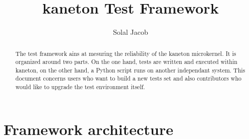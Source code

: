 %
%
%
%
%
%

%
%

\def\path{../..}

%
%



%
%


%
%

\title{kaneton Test Framework}

%
%

\author{\small{Solal Jacob}}

%
%



%
%

\maketitle

%
%

\begin{abstract}

\indent The test framework ains at mesuring the reliability of the kaneton
microkernel. It is organized around two parts. On the one hand, tests are
written and executed within kaneton, on the other hand, a Python script runs on
another independant system. This document concerns users who want to build a
new tests set and also contributors who would like to upgrade the test
environment itself.

\end{abstract}

%
%

\section{Framework architecture}

